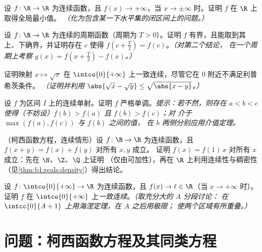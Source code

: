 \begin{exercise}[$\star\star$]\label{exo:b1:continuity:7}
设 $f \colon \R \to \R$ 为连续函数，且 $f(x) \to +\infty$，当 $x
\to \pm\infty$ 时。证明 $f$ 在 $\R$ 上取得全局最小值。
\emph{（化为包含某一下水平集的闭区间上的问题。）}
\end{exercise}

\begin{exercise}[$\star\star$]\label{exo:b1:continuity:8}
设 $f \colon \R \to \R$ 为连续的周期函数（周期为 $T >
0$）。证明 $f$ 有界，且能取到其上、下确界，并证明存在
$c$ 使得 $f(c + \frac T2) = f(c)$。\emph{（对第二个结论，
在一个周期上考察 $g(x) = f(x + \frac T2) - f(x)$。）}
\end{exercise}

\begin{exercise}[$\star\star$]\label{exo:b1:continuity:9}
证明映射 $x \mapsto \sqrt x$ 在
$\intco{0}{+\infty}$ 上一致连续，尽管它在 $0$ 附近不满足利普希茨条件。
\emph{（证明并利用 $\abs{\sqrt x - \sqrt y} \leq \sqrt{\abs{x -
y}}$。）}
\end{exercise}

\begin{exercise}[$\star\star\star$]\label{exo:b1:continuity:10}
设 $f$ 为区间 $I$ 上的连续单射。证明
$f$ 严格单调。\emph{提示：若不然，则存在 $a < b < c$
使得（不妨设）$f(b) > f(a)$ 且 $f(b) > f(c)$；对
介于 $\max(f(a), f(c))$ 与 $f(b)$ 之间的值，
在 $b$ 两侧分别应用介值定理。}
\end{exercise}

\begin{exercise}[$\star\star\star$]\label{exo:b1:continuity:11}
（柯西函数方程，连续情形）设 $f \colon \R \to
\R$ 为连续函数，且 $f(x + y) = f(x) + f(y)$ 对所有 $x, y$ 成立。
证明 $f(x) = f(1)\,x$ 对所有 $x$ 成立：先在 $\N$、$\Z$、$\Q$ 上证明
（仅由可加性），再在 $\R$ 上利用连续性与稠密性
（见\cref{thm:b1:reals:density}）得出结论。
\end{exercise}

\begin{exercise}[$\star\star\star$]\label{exo:b1:continuity:12}
设 $f \colon \intco{0}{+\infty} \to \R$ 为连续函数，且
$f(x) \to \ell \in \R$（当 $x \to +\infty$ 时）。证明 $f$ 在
$\intco{0}{+\infty}$ 上\emph{一致连续}。\emph{（取充分大的 $A$ 分段讨论：
在 $\intcc{0}{A+1}$ 上用海涅定理，在 $A$ 之后用极限；
使两个区域有所重叠。）}
\end{exercise}

\section{问题：柯西函数方程及其同类方程}

